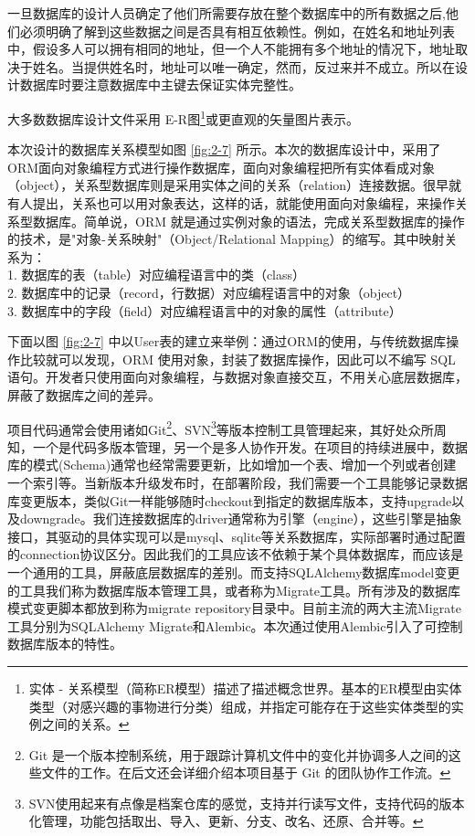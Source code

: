 一旦数据库的设计人员确定了他们所需要存放在整个数据库中的所有数据之后,他们必须明确了解到这些数据之间是否具有相互依赖性。例如，在姓名和地址列表中，假设多人可以拥有相同的地址，但一个人不能拥有多个地址的情况下，地址取决于姓名。当提供姓名时，地址可以唯一确定，然而，反过来并不成立。所以在设计数据库时要注意数据库中主键去保证实体完整性。

大多数数据库设计文件采用 
E-R图\footnote{实体 - 关系模型（简称ER模型）描述了描述概念世界。基本的ER模型由实体类型（对感兴趣的事物进行分类）组成，并指定可能存在于这些实体类型的实例之间的关系。}或更直观的矢量图片表示。

本次设计的数据库关系模型如图 \ref{fig:2-7} 所示。本次的数据库设计中，采用了ORM面向对象编程方式进行操作数据库，面向对象编程把所有实体看成对象（object），关系型数据库则是采用实体之间的关系（relation）连接数据。很早就有人提出，关系也可以用对象表达，这样的话，就能使用面向对象编程，来操作关系型数据库。简单说，ORM 就是通过实例对象的语法，完成关系型数据库的操作的技术，是"对象-关系映射"（Object/Relational Mapping）的缩写。其中映射关系为：
\\ 1. 数据库的表（table）对应编程语言中的类（class）
\\ 2. 数据库中的记录（record，行数据）对应编程语言中的对象（object） 
\\ 3. 数据库中的字段（field）对应编程语言中的对象的属性（attribute）

下面以图 \ref{fig:2-7} 中以User表的建立来举例：通过ORM的使用，与传统数据库操作比较就可以发现，ORM 使用对象，封装了数据库操作，因此可以不编写 SQL 语句。开发者只使用面向对象编程，与数据对象直接交互，不用关心底层数据库，屏蔽了数据库之间的差异。

项目代码通常会使用诸如Git\footnote{Git 是一个版本控制系统，用于跟踪计算机文件中的变化并协调多人之间的这些文件的工作。在后文还会详细介绍本项目基于 Git 的团队协作工作流。}、SVN\footnote{SVN使用起来有点像是档案仓库的感觉，支持并行读写文件，支持代码的版本化管理，功能包括取出、导入、更新、分支、改名、还原、合并等。}等版本控制工具管理起来，其好处众所周知，一个是代码多版本管理，另一个是多人协作开发。在项目的持续进展中，数据库的模式(Schema)通常也经常需要更新，比如增加一个表、增加一个列或者创建一个索引等。当新版本升级发布时，在部署阶段，我们需要一个工具能够记录数据库变更版本，类似Git一样能够随时checkout到指定的数据库版本，支持upgrade以及downgrade。我们连接数据库的driver通常称为引擎（engine），这些引擎是抽象接口，其驱动的具体实现可以是mysql、sqlite等关系数据库，实际部署时通过配置的connection协议区分。因此我们的工具应该不依赖于某个具体数据库，而应该是一个通用的工具，屏蔽底层数据库的差别。而支持SQLAlchemy数据库model变更的工具我们称为数据库版本管理工具，或者称为Migrate工具。所有涉及的数据库模式变更脚本都放到称为migrate repository目录中。目前主流的两大主流Migrate工具分别为SQLAlchemy Migrate和Alembic。本次通过使用Alembic引入了可控制数据库版本的特性。

